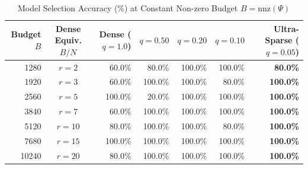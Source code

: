 \begin{table}[htbp]
\centering
\small
\caption{Model Selection Accuracy (\%) at Constant Non-zero Budget $B = \mathrm{nnz}(\Psi)$}
\label{tab:budget_matched}
\begin{tabular}{rcrrrrr}
\toprule
Budget $B$ & Dense Equiv. $B/N$ & Dense ($q=1.0$) & $q=0.50$ & $q=0.20$ & $q=0.10$ & Ultra-Sparse ($q=0.05$) \\
\midrule
 1280 & $r= 2$ &  60.0\% &  80.0\% & 100.0\% & 100.0\% & \textbf{ 80.0\%} \\
 1920 & $r= 3$ &  60.0\% & 100.0\% & 100.0\% &  80.0\% & \textbf{100.0\%} \\
 2560 & $r= 5$ & 100.0\% &  20.0\% & 100.0\% & 100.0\% & \textbf{100.0\%} \\
 3840 & $r= 7$ &  60.0\% & 100.0\% & 100.0\% & 100.0\% & \textbf{100.0\%} \\
 5120 & $r=10$ &  80.0\% & 100.0\% & 100.0\% &  80.0\% & \textbf{100.0\%} \\
 7680 & $r=15$ & 100.0\% & 100.0\% & 100.0\% & 100.0\% & \textbf{100.0\%} \\
10240 & $r=20$ &  80.0\% & 100.0\% & 100.0\% & 100.0\% & \textbf{100.0\%} \\
\bottomrule
\end{tabular}
\end{table}
